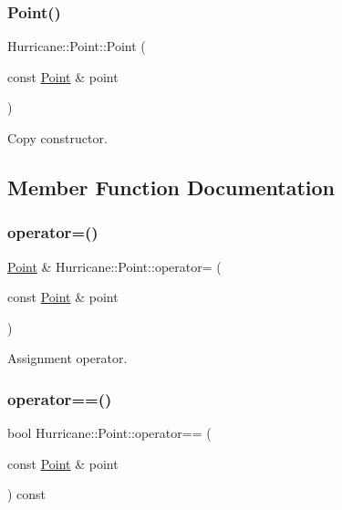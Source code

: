\subsubsection{\texorpdfstring{Point()}{Point()}\hspace{0.1cm}{\footnotesize\ttfamily [3/3]}}
{\footnotesize\ttfamily Hurricane\+::\+Point\+::\+Point (\begin{DoxyParamCaption}\item[{const \mbox{\hyperlink{classHurricane_1_1Point}{Point}} \&}]{point }\end{DoxyParamCaption})}

Copy constructor. 

\subsection{Member Function Documentation}
\mbox{\label{classHurricane_1_1Point_ae3e33361927744a483d97cb7d182a1d6}} 
\subsubsection{\texorpdfstring{operator=()}{operator=()}}
{\footnotesize\ttfamily \mbox{\hyperlink{classHurricane_1_1Point}{Point}} \& Hurricane\+::\+Point\+::operator= (\begin{DoxyParamCaption}\item[{const \mbox{\hyperlink{classHurricane_1_1Point}{Point}} \&}]{point }\end{DoxyParamCaption})}

Assignment operator. \mbox{\label{classHurricane_1_1Point_a2aeb5fe96fbe9324dcbc90d41ad70fb9}} 
\subsubsection{\texorpdfstring{operator==()}{operator==()}}
{\footnotesize\ttfamily bool Hurricane\+::\+Point\+::operator== (\begin{DoxyParamCaption}\item[{const \mbox{\hyperlink{classHurricane_1_1Point}{Point}} \&}]{point }\end{DoxyParamCaption}) const}

